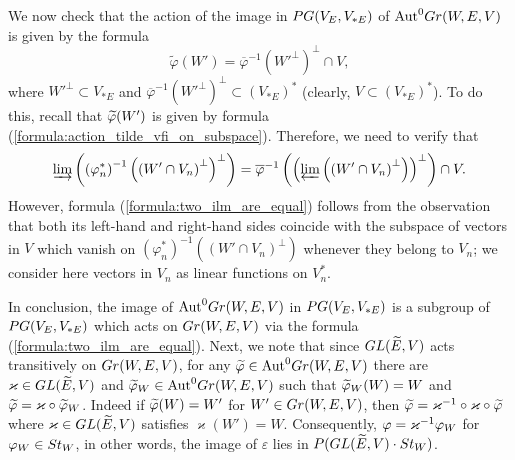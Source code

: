 \documentclass[11pt, a4paper]{article}
\begin{document}
We now check that the action of the image in $P G(V_E,V_{*E})$ of $\mathrm{Aut}^0Gr(W,E,V)$ is given by the formula \begin{equation*}
	\widetilde{\varphi}\left(W'\right)=\overline{\varphi}^{-1}\left(W'^{\perp}\right)^{\perp}\cap V,
\end{equation*}
where $W'^{\perp}\subset V_{*E}$ and $\overline{\varphi}^{-1}\left( W'^{\perp}\right)^{\perp}\subset (V_{*E})^*$ (clearly, $V\subset (V_{*E})^*$). To do this, recall that  $\widetilde{\varphi}(W')$ is given by formula (\ref{formula:action_tilde_vfi_on_subspace}). %
Therefore, we need to verify that \begin{equation}\label{formula:two_ilm_are_equal}
	\varinjlim \left(\left(\varphi^*_n\right)^{-1}\left(\left(W'\cap V_n\right)^\perp\right)^\perp\right)=\overline{\varphi}^{-1}\left(\left(\varprojlim\left(\left(W'\cap V_n\right)^\perp\right)\right)^\perp\right) \cap V.
\end{equation}
However, formula (\ref{formula:two_ilm_are_equal})  follows from the observation that both its left-hand and right-hand sides coincide with the subspace of vectors in $V$ which vanish on $\left(\varphi^*_n\right)^{-1}\left(\left(W'\cap V_n\right)^\perp\right)$ whenever they belong to $V_n$; we consider here vectors in $V_n$ as %
linear functions on $V^*_n$.

In conclusion, the image of $\mathrm{Aut}^0Gr(W,E,V)$ in $P G(V_E,V_{*E})$ is a subgroup of $P G(V_E,V_{*E})$ which acts on $Gr(W,E,V)$ via the formula (\ref{formula:two_ilm_are_equal}). 
Next, we note that since $GL(\widetilde{E},V)$ acts transitively on $Gr(W,E,V)$, for any $\widetilde{\varphi}\in \mathrm{Aut}^0Gr(W,E,V)$ there are $\varkappa\in GL(\widetilde{E},V)$ and  $\widetilde{\varphi}_W\in \mathrm{Aut}^0Gr(W,E,V)$ %
such that $\widetilde{\varphi}_W(W)=W$ and $\widetilde{\varphi}=\varkappa\circ \widetilde{\varphi}_W$. 
Indeed if %
$\widetilde{\varphi}(W)=W'$ for $W'\in Gr(W,E,V)$, then $\widetilde{\varphi}=   \varkappa^{-1}\circ \varkappa \circ \widetilde{\varphi}$ where $\varkappa\in GL(\widetilde{E},V)$ satisfies $\varkappa(W')=W$.
Consequently,  $\varphi=\varkappa^{-1}\varphi_W$ for $\varphi_W\in St_W$, in other words,   the image of $\varepsilon$ lies in $P(GL(\widetilde{E},V)\cdot St_W)$. 
\end{document}
